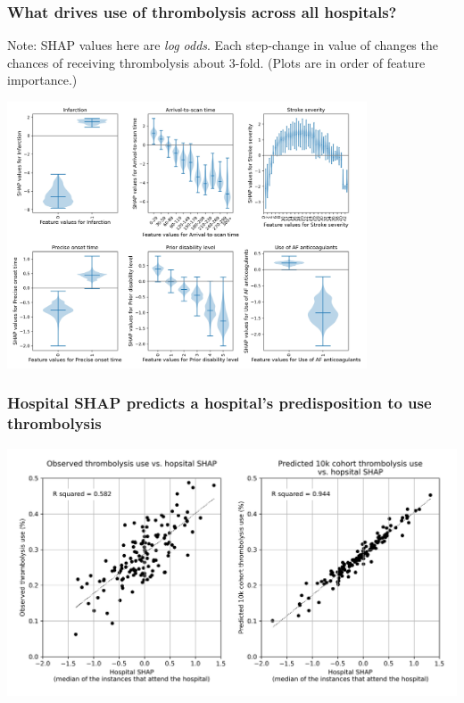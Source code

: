 \documentclass{beamer}
\begin{document}

\begin{frame}
\frametitle{What drives use of thrombolysis across all hospitals?}

\footnotesize{Note: SHAP values here are \emph{log odds}. Each step-change in value of  changes the chances of receiving thrombolysis about 3-fold. (Plots are in order of feature importance.)}

\begin{center}
\includegraphics[width=0.80\textwidth]{./images/03_xgb_10_features_thrombolysis_shap_violin.jpg}
\end{center}
\end{frame}


\begin{frame}
\frametitle{Hospital SHAP predicts a hospital's predisposition to use thrombolysis}

\begin{center}
\includegraphics[width=1.0\textwidth]{./images/99_twin_correlation_scatter.jpg}
\end{center}
\end{frame}
\end{document}
